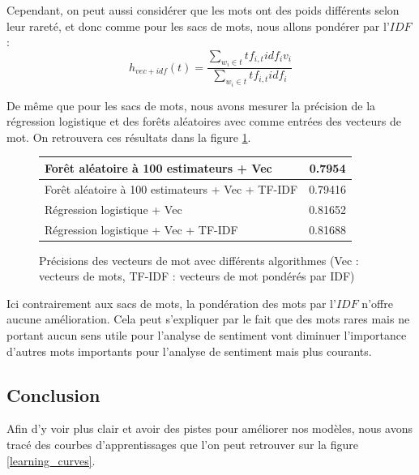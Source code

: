 \documentclass{article}
\begin{document}
Cependant, on peut aussi considérer que les mots ont des poids différents selon leur rareté, et donc comme pour les sacs de mots, nous allons pondérer par l'$IDF$ :
$$
h_{vec+idf}(t) = \frac{\sum_{w_{i} \in t}{tf_{i, t}idf_{i}v_{i}}}{\sum_{w_{i} \in t}{tf_{i, t}idf_{i}}}
$$

De même que pour les sacs de mots, nous avons mesurer la précision de la régression logistique et des forêts aléatoires avec comme entrées des vecteurs de mot. On retrouvera ces résultats dans la figure \ref{results_vec}.

\begin{figure}
\begin{center}
\begin{tabular}{|l|c|}
	\hline
	Forêt aléatoire à 100 estimateurs + Vec & 0.7954 \\
	\hline
	Forêt aléatoire à 100 estimateurs + Vec + TF-IDF & 0.79416 \\
	\hline
	Régression logistique + Vec & 0.81652 \\
	\hline
	Régression logistique + Vec + TF-IDF & 0.81688 \\
	\hline
\end{tabular}
\caption{Précisions des vecteurs de mot avec différents algorithmes (Vec : vecteurs de mots, TF-IDF : vecteurs de mot pondérés par IDF)}
\label{results_vec}
\end{center}
\end{figure}

Ici contrairement aux sacs de mots, la pondération des mots par l'$IDF$ n'offre aucune amélioration. Cela peut s'expliquer par le fait que des mots rares mais ne portant aucun sens utile pour l'analyse de sentiment vont diminuer l'importance d'autres mots importants pour l'analyse de sentiment mais plus courants. 

\subsection{Conclusion}

Afin d'y voir plus clair et avoir des pistes pour améliorer nos modèles, nous avons tracé des courbes d'apprentissages que l'on peut retrouver sur la figure \ref{learning_curves}.
\end{document}
